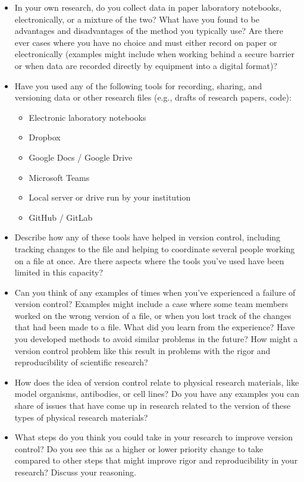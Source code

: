 \documentclass[]{tufte-book}
\providecommand{\tightlist}{%
  \setlength{\itemsep}{0pt}\setlength{\parskip}{0pt}}
\begin{document}
\begin{itemize}
\tightlist
\item
  In your own research, do you collect data in paper laboratory notebooks, electronically, or a mixture of the two? What have you found to be advantages and disadvantages of the method you typically use? Are there ever cases where you have no choice and must either record on paper or electronically (examples might include when working behind a secure barrier or when data are recorded directly by equipment into a digital format)?\\
\item
  Have you used any of the following tools for recording, sharing, and versioning data or other research files (e.g., drafts of research papers, code):

  \begin{itemize}
  \tightlist
  \item
    Electronic laboratory notebooks
  \item
    Dropbox
  \item
    Google Docs / Google Drive
  \item
    Microsoft Teams
  \item
    Local server or drive run by your institution
  \item
    GitHub / GitLab
  \end{itemize}
\item
  Describe how any of these tools have helped in version control, including tracking changes to the file and helping to coordinate several people working on a file at once. Are there aspects where the tools you've used have been limited in this capacity?
\item
  Can you think of any examples of times when you've experienced a failure of version control? Examples might include a case where some team members worked on the wrong version of a file, or when you lost track of the changes that had been made to a file. What did you learn from the experience? Have you developed methods to avoid similar problems in the future? How might a version control problem like this result in problems with the rigor and reproducibility of scientific research?
\item
  How does the idea of version control relate to physical research materials, like model organisms, antibodies, or cell lines? Do you have any examples you can share of issues that have come up in research related to the version of these types of physical research materials?
\item
  What steps do you think you could take in your research to improve version control? Do you see this as a higher or lower priority change to take compared to other steps that might improve rigor and reproducibility in your research? Discuss your reasoning.
\end{itemize}
\end{document}
